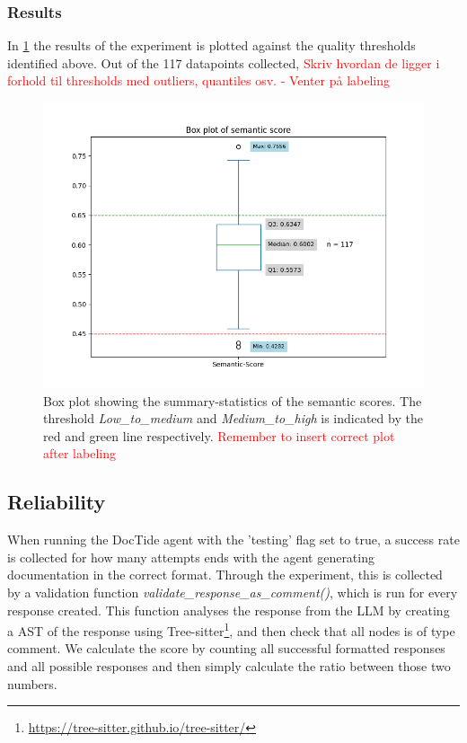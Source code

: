 \subsubsection{Results}
In \cref{fig:sem_box} the results of the experiment is plotted against the quality thresholds identified above. Out of the 117 datapoints collected, \textcolor{red}{Skriv hvordan de ligger i forhold til thresholds med outliers, quantiles osv. - Venter på labeling}

\label{sec:sem_results}
\begin{figure}[H]
\centering
\includegraphics[width=0.7\linewidth]{Figures/semantic_score_box_plot.png}
\caption{Box plot showing the summary-statistics of the semantic scores. The threshold \textit{Low\_to\_medium} and \textit{Medium\_to\_high} is indicated by the red and green line respectively. \textcolor{red}{Remember to insert correct plot after labeling}}
\label{fig:sem_box}
\end{figure}

\subsection{Reliability}
When running the DocTide agent with the 'testing' flag set to true, a success rate is collected for how many attempts ends with the agent generating documentation in the correct format.
Through the experiment, this is collected by a validation function \textit{validate\_response\_as\_comment()}, which is run for every response created. This function analyses the response from the LLM by creating a AST of the response using Tree-sitter\footnote{\url{https://tree-sitter.github.io/tree-sitter/}}, and then check that all nodes is of type comment.
We calculate the score by counting all successful formatted responses and all possible responses and then simply calculate the ratio between those two numbers.
